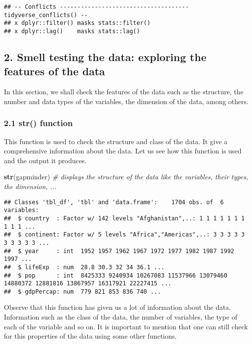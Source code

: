 \documentclass[]{article}
\newenvironment{Shaded}{\begin{snugshade}}{\end{snugshade}}
\newcommand{\KeywordTok}[1]{\textcolor[rgb]{0.13,0.29,0.53}{\textbf{{#1}}}}
\newcommand{\CommentTok}[1]{\textcolor[rgb]{0.56,0.35,0.01}{\textit{{#1}}}}
\newcommand{\NormalTok}[1]{{#1}}
\begin{document}
\begin{verbatim}
## -- Conflicts ------------------------------------- tidyverse_conflicts() --
## x dplyr::filter() masks stats::filter()
## x dplyr::lag()    masks stats::lag()
\end{verbatim}

\subsection{2. Smell testing the data: exploring the features of the
data}\label{smell-testing-the-data-exploring-the-features-of-the-data}

In this section, we shall check the features of the data such as the
structure, the number and data types of the variables, the dimension of
the data, among others.

\subsubsection{\texorpdfstring{2.1 \textbf{str()}
function}{2.1 str() function}}\label{str-function}

This function is used to check the structure and class of the data. It
give a comprehensive information about the data. Let us see how this
function is used and the output it produces.

\begin{Shaded}
\begin{Highlighting}[]
\KeywordTok{str}\NormalTok{(gapminder)  }\CommentTok{# displays the structure of the data like the variables, their types, the dimension, ...}
\end{Highlighting}
\end{Shaded}

\begin{verbatim}
## Classes 'tbl_df', 'tbl' and 'data.frame':    1704 obs. of  6 variables:
##  $ country  : Factor w/ 142 levels "Afghanistan",..: 1 1 1 1 1 1 1 1 1 1 ...
##  $ continent: Factor w/ 5 levels "Africa","Americas",..: 3 3 3 3 3 3 3 3 3 3 ...
##  $ year     : int  1952 1957 1962 1967 1972 1977 1982 1987 1992 1997 ...
##  $ lifeExp  : num  28.8 30.3 32 34 36.1 ...
##  $ pop      : int  8425333 9240934 10267083 11537966 13079460 14880372 12881816 13867957 16317921 22227415 ...
##  $ gdpPercap: num  779 821 853 836 740 ...
\end{verbatim}

Observe that this function has given us a lot of information about the
data. Information such as the class of the data, the number of
variables, the type of each of the variable and so on. It is important
to mention that one can still check for this properties of the data
using some other functions.
\end{document}
